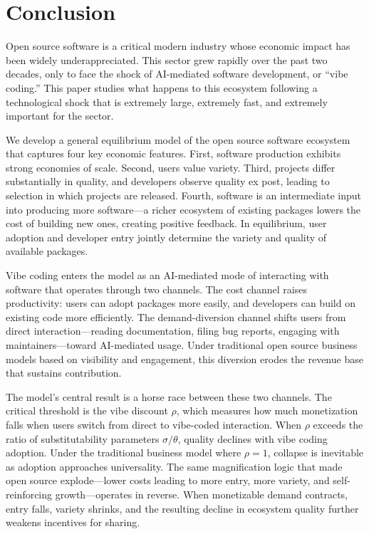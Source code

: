 \documentclass[11pt,a4paper]{article}
\theoremstyle{definition}
\theoremstyle{remark}
\begin{document}
\section{Conclusion}\label{sec:conclusion}

Open source software is a critical modern industry whose economic impact has been widely underappreciated. This sector grew rapidly over the past two decades, only to face the shock of AI-mediated software development, or ``vibe coding.'' This paper studies what happens to this ecosystem following a technological shock that is extremely large, extremely fast, and extremely important for the sector.

We develop a general equilibrium model of the open source software ecosystem that captures four key economic features. First, software production exhibits strong economies of scale. Second, users value variety. Third, projects differ substantially in quality, and developers observe quality ex post, leading to selection in which projects are released. Fourth, software is an intermediate input into producing more software---a richer ecosystem of existing packages lowers the cost of building new ones, creating positive feedback. In equilibrium, user adoption and developer entry jointly determine the variety and quality of available packages.

Vibe coding enters the model as an AI-mediated mode of interacting with software that operates through two channels. The cost channel raises productivity: users can adopt packages more easily, and developers can build on existing code more efficiently. The demand-diversion channel shifts users from direct interaction---reading documentation, filing bug reports, engaging with maintainers---toward AI-mediated usage. Under traditional open source business models based on visibility and engagement, this diversion erodes the revenue base that sustains contribution.

The model's central result is a horse race between these two channels. The critical threshold is the vibe discount $\rho$, which measures how much monetization falls when users switch from direct to vibe-coded interaction. When $\rho$ exceeds the ratio of substitutability parameters $\sigma/\theta$, quality declines with vibe coding adoption. Under the traditional business model where $\rho = 1$, collapse is inevitable as adoption approaches universality. The same magnification logic that made open source explode---lower costs leading to more entry, more variety, and self-reinforcing growth---operates in reverse. When monetizable demand contracts, entry falls, variety shrinks, and the resulting decline in ecosystem quality further weakens incentives for sharing.
\end{document}
